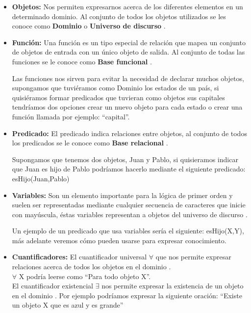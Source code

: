 \documentclass[11pt,fleqn]{book} %
\begin{document}
\begin{itemize}
\item \textbf{Objetos:} Nos permiten expresarnos acerca de los diferentes elementos en un determinado dominio. Al conjunto de todos los objetos utilizados se les conoce como \textbf{Dominio} o \textbf{Universo de discurso} \cite{guerra_repcon}.

\item \textbf{Función:} Una función es un tipo especial de relación que mapea un conjunto de objetos de entrada con un único objeto de salida. Al conjunto de todas las funciones se le conoce como \textbf{Base funcional} \cite{guerra_repcon}.

Las funciones nos sirven para evitar la necesidad de declarar muchos objetos, supongamos que tuviéramos como Dominio los estados de un país, si quisiéramos formar predicados que tuvieran como objetos sus capitales tendríamos dos opciones crear un nuevo objeto para cada estado o crear una función llamada por ejemplo: “capital”.

\item \textbf{Predicado:} El predicado indica relaciones entre objetos, al conjunto de todos los predicados se le conoce como \textbf{Base relacional} \cite{guerra_repcon}.

Supongamos que tenemos dos objetos, Juan y Pablo, si quisieramos indicar que Juan es hijo de Pablo podríamos hacerlo mediante el siguiente predicado:
esHijo(Juan,Pablo)

\item \textbf{Variables:} Son un elemento importante para la lógica de primer orden y suelen ser representadas mediante cualquier secuencia de caracteres que inicie con mayúscula, éstas variables representan a objetos del universo de discurso \cite{guerra_repcon}. 

Un ejemplo de un predicado que usa variables sería el siguiente: esHijo(X,Y), más adelante veremos cómo pueden usarse para expresar conocimiento.

\item \textbf{Cuantificadores:} El cuantificador universal $\forall$ que nos permite expresar relaciones acerca de todos los objetos en el dominio \cite{guerra_repcon}. \\

$\forall$ X podría leerse como “Para todo objeto X”.\\

El cuantificador existencial $\exists$ nos permite expresar la existencia de un objeto en el dominio \cite{guerra_repcon}. Por ejemplo podríamos expresar la siguiente oración: “Existe un objeto X que es azul y es grande”\\


\end{itemize}
\end{document}
